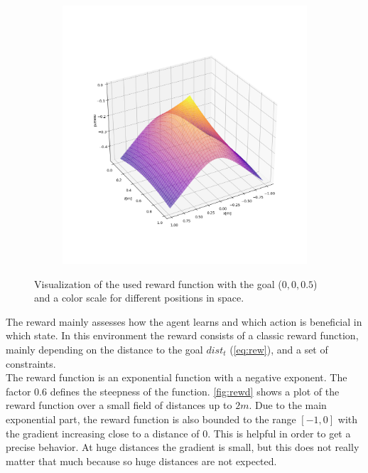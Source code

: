 \begin{figure}
\begin{subfigure}{0.32\linewidth}
		\caption{}
	\end{subfigure}
	\begin{subfigure}{0.32\linewidth}
		\includegraphics[width=\linewidth]{figures/rewXZ.png}
		\caption{}
	\end{subfigure}
	\caption{Visualization of the used reward function with the goal ($0,0,0.5$) and a color scale for different positions in space.}
	\label{fig:rewr}
\end{figure}
The reward mainly assesses how the agent learns and which action is beneficial in which state.
In this environment the reward consists of a classic reward function, mainly depending on the distance to the goal $dist_t$ (\cref{eq:rew}), and a set of constraints.\\
The reward function is an exponential function with a negative exponent. 
The factor $0.6$ defines the steepness of the function. \cref{fig:rewd} shows a plot of the reward function over a small field of distances up to $2m$. 
Due to the main exponential part, the reward function is also bounded to the range $[-1, 0]$ with the gradient increasing close to a distance of $0$. 
This is helpful in order to get a precise behavior. At huge distances the gradient is small, 
but this does not really matter that much because so huge distances are not expected.
